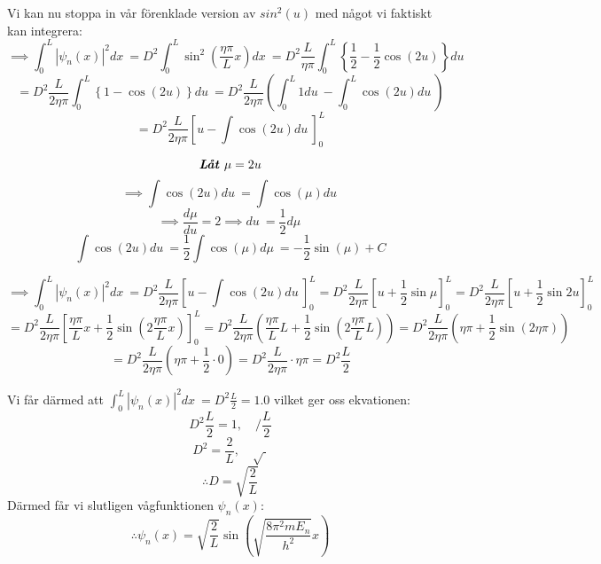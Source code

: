 \documentclass{article}
\newcommand{\shrodprob}{|\psi_n(x)|^2}
\begin{document}
Vi kan nu stoppa in vår förenklade version av $sin^2(u)$ med något vi faktiskt kan integrera:
$$
\implies \int_0^L \shrodprob dx\ 
= D^2 \int_0^L \sin^2\left( \frac{\eta\pi}{L} x \right) dx\ 
= D^2 \frac{L}{\eta\pi} \int_0^L \left\{ \frac{1}{2} - \frac{1}{2}\cos(2u) \right\} du\ 
$$
$$
= D^2 \frac{L}{2\eta\pi} \int_0^L \left\{ 1 - \cos(2u) \right\} du\ 
= D^2 \frac{L}{2\eta\pi} \left( \int_0^L 1 du\ - \int_0^L \cos(2u) du\ \right)
$$
$$
= D^2 \frac{L}{2\eta\pi} \left[u - \int \cos(2u) du\ \right]_0^L
$$

$$
\emph{\textbf{Låt $\mu = 2u$}}
$$
$$
\implies \int \cos(2u) du\ = \int \cos(\mu) du\
$$
$$
\implies \frac{d\mu}{du} = 2 \implies du\ = \frac{1}{2} d\mu\
$$
$$
\int \cos(2u) du\ = \frac{1}{2} \int \cos(\mu) d\mu\ = -\frac{1}{2} \sin(\mu) + C
$$

$$
\implies \int_0^L \shrodprob dx\ 
= D^2 \frac{L}{2\eta\pi} \left[u - \int \cos(2u) du\ \right]_0^L
= D^2 \frac{L}{2\eta\pi} \left[ u + \frac{1}{2}\sin \mu \right]_0^L
= D^2 \frac{L}{2\eta\pi} \left[ u + \frac{1}{2}\sin 2u \right]_0^L
$$
$$
= D^2 \frac{L}{2\eta\pi} \left[ \frac{\eta\pi}{L}x + \frac{1}{2}\sin\left(2\frac{\eta\pi}{L}x\right) \right]_0^L
= D^2 \frac{L}{2\eta\pi} \left(\frac{\eta\pi}{L}L + \frac{1}{2}\sin\left(2\frac{\eta\pi}{L}L\right) \right)
= D^2 \frac{L}{2\eta\pi} \left(\eta\pi + \frac{1}{2}\sin\left(2\eta\pi\right) \right)
$$
$$
= D^2 \frac{L}{2\eta\pi} \left(\eta\pi + \frac{1}{2} \cdot 0 \right)
= D^2 \frac{L}{2\eta\pi} \cdot \eta\pi
= D^2 \frac{L}{2}
$$

Vi får därmed att $\int_0^L \shrodprob dx\ = D^2 \frac{L}{2} = 1.0$ vilket ger oss ekvationen:
$$
D^2 \frac{L}{2} = 1, \quad / \frac{L}{2}
$$
$$
D^2 = \frac{2}{L}, \quad \sqrt{\ }
$$
$$
\therefore D = \sqrt{ \frac{2}{L} }
$$
Därmed får vi slutligen vågfunktionen $\psi_n(x)$:
\begin{equation} \label{wavefun_part}
	\therefore \psi_n(x) = \sqrt{ \frac{2}{L} } \sin \left( \sqrt{\frac{8 \pi^2 m E_n}{h^2}} x \right)
\end{equation}
\end{document}
